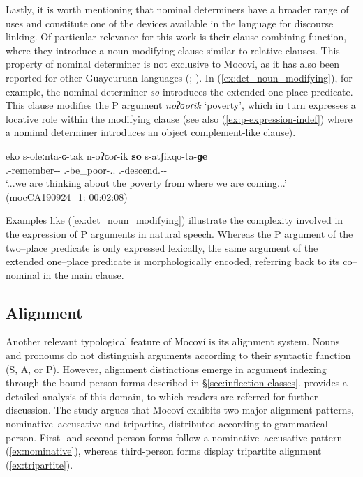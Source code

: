 \documentclass[12pt]{article}
\begin{document}
Lastly, it is worth mentioning that nominal determiners have a broader range of uses and constitute one of the devices available in the language for discourse linking. Of particular relevance for this work is their clause-combining function, where they  introduce  a noun-modifying clause similar to relative clauses. This property of nominal determiner is not exclusive to Mocoví, as it has also been reported for other Guaycuruan languages (\citealp[114--115]{gualdieri1998}; \citealp[for an overview on Toba relative clauses, see][]{carpio.censabella2012,messineo.porta2009}). In (\ref{ex:det_noun_modifying}), for example, the nominal determiner \textit{so} introduces the extended one-place predicate. This clause modifies the P argument \textit{noʔɢoɾik} `poverty', which in turn expresses a locative role within the modifying clause (see also  (\ref{ex:p-expression-indef}) where a nominal determiner introduces an object complement-like clause).  
\newpage
\begin{exe}
\ex  \label{ex:det_noun_modifying}
\gll eko s-oleːnta-ɢ-tak n-oʔɢoɾ-ik \textbf{so} s-atʃikqo-ta-\textbf{ɡe}  \\
{\Disc} {\First.\II}-remember-{\Pl}-{\Prog} {\Indet.\Poss}-be\_poor-{\Nmlz.\Obj.\Sg} {\DetTwo} {\First.\III}-descend.{\Pl}-{\Dur}-{\LocThree} \\	
\trans `...we are thinking about the poverty from where we are coming...'
\trans  \hfill(mocCA190924\_1: 00:02:08)
\end{exe}

Examples like (\ref{ex:det_noun_modifying}) illustrate the complexity involved in the expression of P arguments in natural speech.  Whereas  the P argument of the two--place predicate is only expressed lexically, the same argument of the extended one--place predicate is morphologically encoded, referring back to its co--nominal in the main clause. 


\subsection{Alignment}
Another relevant typological feature of Mocoví is its alignment system. Nouns and pronouns do not distinguish arguments according to their syntactic function (S, A, or P). However, alignment distinctions emerge in argument indexing through the bound person forms described in \S \ref{sec:inflection-classes}. \citet{juarez2013} provides a detailed analysis of this domain, to which readers are referred for further discussion. The study argues that Mocoví exhibits two major alignment patterns, nominative--accusative and tripartite, distributed according to grammatical person. First- and second-person forms follow a nominative--accusative pattern (\ref{ex:nominative}), whereas third-person forms display tripartite alignment (\ref{ex:tripartite}). 
\end{document}
